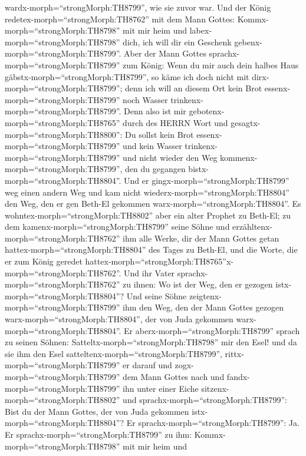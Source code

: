 wardx-morph=``strongMorph:TH8799'', wie sie zuvor war.  Und
der König redetex-morph=``strongMorph:TH8762'' mit dem Mann Gottes:
Kommx-morph=``strongMorph:TH8798'' mit mir heim und
labex-morph=``strongMorph:TH8798'' dich, ich will dir ein Geschenk
gebenx-morph=``strongMorph:TH8799''.  Aber der Mann Gottes
sprachx-morph=``strongMorph:TH8799'' zum König: Wenn du mir auch dein
halbes Haus gäbstx-morph=``strongMorph:TH8799'', so käme ich doch nicht
mit dirx-morph=``strongMorph:TH8799''; denn ich will an diesem Ort kein
Brot essenx-morph=``strongMorph:TH8799'' noch Wasser
trinkenx-morph=``strongMorph:TH8799''.  Denn also ist mir
gebotenx-morph=``strongMorph:TH8765'' durch des HERRN Wort und
gesagtx-morph=``strongMorph:TH8800'': Du sollst kein Brot
essenx-morph=``strongMorph:TH8799'' und kein Wasser
trinkenx-morph=``strongMorph:TH8799'' und nicht wieder den Weg
kommenx-morph=``strongMorph:TH8799'', den du gegangen
bistx-morph=``strongMorph:TH8804''.  Und er
gingx-morph=``strongMorph:TH8799'' weg einen andern Weg und kam nicht
wiederx-morph=``strongMorph:TH8804'' den Weg, den er gen Beth-El
gekommen warx-morph=``strongMorph:TH8804''.  Es
wohntex-morph=``strongMorph:TH8802'' aber ein alter Prophet zu Beth-El;
zu dem kamenx-morph=``strongMorph:TH8799'' seine Söhne und
erzähltenx-morph=``strongMorph:TH8762'' ihm alle Werke, dir der Mann
Gottes getan hattex-morph=``strongMorph:TH8804'' des Tages zu Beth-El,
und die Worte, die er zum König geredet
hattex-morph=``strongMorph:TH8765''x-morph=``strongMorph:TH8762''.
 Und ihr Vater sprachx-morph=``strongMorph:TH8762'' zu
ihnen: Wo ist der Weg, den er gezogen istx-morph=``strongMorph:TH8804''?
Und seine Söhne zeigtenx-morph=``strongMorph:TH8799'' ihm den Weg, den
der Mann Gottes gezogen warx-morph=``strongMorph:TH8804'', der von Juda
gekommen warx-morph=``strongMorph:TH8804''.  Er
aberx-morph=``strongMorph:TH8799'' sprach zu seinen Söhnen:
Satteltx-morph=``strongMorph:TH8798'' mir den Esel! und da sie ihm den
Esel satteltenx-morph=``strongMorph:TH8799'',
rittx-morph=``strongMorph:TH8799'' er darauf  und
zogx-morph=``strongMorph:TH8799'' dem Mann Gottes nach und
fandx-morph=``strongMorph:TH8799'' ihn unter einer Eiche
sitzenx-morph=``strongMorph:TH8802'' und
sprachx-morph=``strongMorph:TH8799'': Bist du der Mann Gottes, der von
Juda gekommen istx-morph=``strongMorph:TH8804''? Er
sprachx-morph=``strongMorph:TH8799'': Ja.  Er
sprachx-morph=``strongMorph:TH8799'' zu ihm:
Kommx-morph=``strongMorph:TH8798'' mit mir heim und
